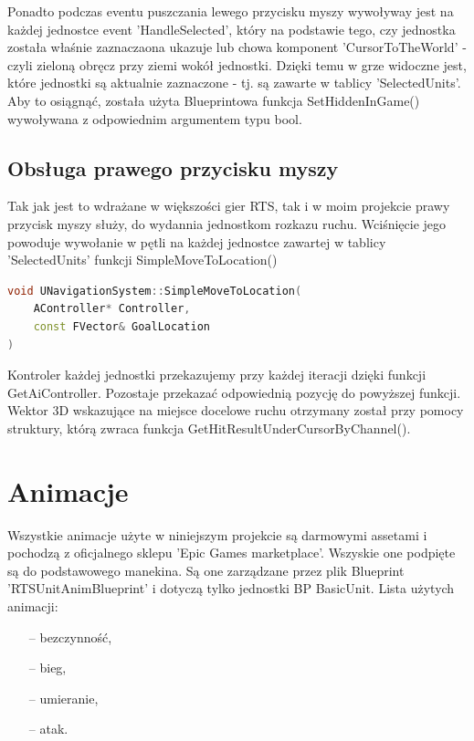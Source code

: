 \documentclass[12pt]{report}
\begin{document}
Ponadto podczas eventu puszczania lewego przycisku myszy wywoływay jest na każdej jednostce event 'HandleSelected', który na podstawie tego, czy jednostka została właśnie zaznaczaona ukazuje lub chowa komponent 'CursorToTheWorld' - czyli zieloną obręcz przy ziemi wokół jednostki. Dzięki temu w grze widoczne jest, które jednostki są aktualnie zaznaczone - tj. są zawarte w tablicy 'SelectedUnits'. Aby to osiągnąć, została użyta Blueprintowa funkcja SetHiddenInGame() wywoływana z odpowiednim argumentem typu bool.

\subsection{Obsługa prawego przycisku myszy}
Tak jak jest to wdrażane w większości gier RTS, tak i w moim projekcie prawy przycisk myszy służy, do wydannia jednostkom rozkazu ruchu. Wciśnięcie jego powoduje wywołanie w pętli na każdej jednostce zawartej w tablicy 'SelectedUnits' funkcji SimpleMoveToLocation()

\begin{lstlisting}[language=C++, backgroundcolor=\color{black!5}, basicstyle=\footnotesize, caption=Funkcja SimpleMoveToLocation() w klasie UNavigationSystem.]
void UNavigationSystem::SimpleMoveToLocation(
    AController* Controller, 
    const FVector& GoalLocation
)
\end{lstlisting}
Kontroler każdej jednostki przekazujemy przy każdej iteracji dzięki funkcji GetAiController. Pozostaje przekazać odpowiednią pozycję do powyższej funkcji. Wektor 3D wskazujące na miejsce docelowe ruchu otrzymany został przy pomocy struktury, którą zwraca funkcja GetHitResultUnderCursorByChannel(). 

\section{Animacje}
Wszystkie animacje użyte w niniejszym projekcie są darmowymi assetami i pochodzą z oficjalnego sklepu 'Epic Games marketplace'. Wszyskie one podpięte są do podstawowego manekina. Są one zarządzane przez plik Blueprint 'RTSUnitAnimBlueprint' i dotyczą tylko jednostki BP BasicUnit. Lista użytych animacji:
\begin{itemize}
\item[--] bezczynność,
\item[--] bieg,
\item[--] umieranie, 
\item[--] atak. 
\end{itemize}
\end{document}
